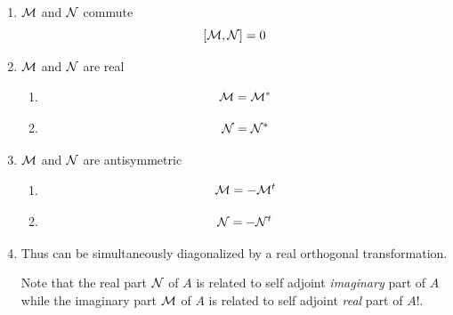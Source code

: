 \begin{enumerate}
\item ${\cal M}$ and ${\cal N}$ commute%
\begin{equation}
\left[ {\cal M},{\cal N}\right] =0
\end{equation}

\item ${\cal M}$ and ${\cal N}$ are real

\begin{enumerate}
\item 
\begin{equation}
{\cal M}={\cal M}^{\ast }
\end{equation}

\item 
\begin{equation}
{\cal N}={\cal N}^{\ast }
\end{equation}
\end{enumerate}

\item ${\cal M}$ and ${\cal N}$ are antisymmetric

\begin{enumerate}
\item 
\begin{equation}
{\cal M}=-{\cal M}^{t}
\end{equation}

\item 
\begin{equation}
{\cal N}=-{\cal N}^{t}
\end{equation}
\end{enumerate}

\item Thus can be simultaneously diagonalized by a real orthogonal
transformation.

\begin{remark}
Note that the real part ${\cal N}$ of $A$ is related to self adjoint {\em %
imaginary} part of $A$ while the imaginary part ${\cal M}$ of $A$ is related
to self adjoint {\em real} part of $A$!.
\end{remark}


\end{enumerate}
